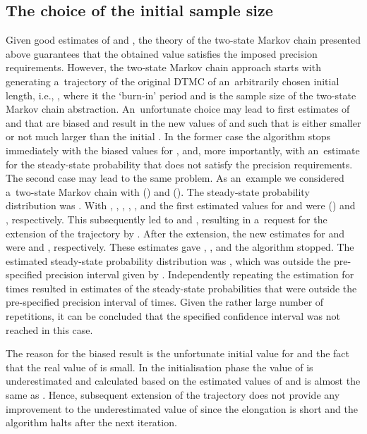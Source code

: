 \documentclass[runningheads,a4paper]{llncs}
\begin{document}
\subsection{The choice of the initial sample size}
Given good estimates of  and , the theory of the two-state Markov chain presented
above guarantees that the obtained value satisfies the imposed precision requirements.
However, the two-state Markov chain approach starts with generating a~trajectory of the original
DTMC of an~arbitrarily chosen initial length, i.e., , where
 it the `burn-in' period and  is the sample size of the two-state Markov chain
abstraction. An~unfortunate choice may lead to first estimates of  and  that are
biased and result in the new values of  and  such that  is either smaller or not much
larger than the initial . In the former case the algorithm stops immediately with the
biased values for ,  and, more importantly, with an~estimate for the steady-state
probability that does not satisfy the precision requirements. The second case may lead to the same
problem. As an~example we considered a~two-state Markov chain with 
() and  (). The steady-state probability distribution was
. With , , , , ,
and  the first estimated values for  and  were 
() and , respectively. This subsequently led to  and , resulting in
a~request for the extension of the trajectory by . After the extension, the new estimates for
 and  were  and , respectively. These estimates gave ,
, and the algorithm stopped. The estimated steady-state probability distribution was
, which was outside the pre-specified precision interval given by .
Independently repeating the estimation for  times resulted in estimates of the
steady-state probabilities that were outside the pre-specified precision interval  of times.
Given the rather large number of repetitions, it can be concluded that the specified 
confidence interval was not reached in this case.

The reason for the biased result is the unfortunate initial value for  and the fact that
the real value of  is small. In the initialisation phase the value of 
is underestimated and  calculated based on the estimated values of
 and  is almost the same as . Hence, subsequent extension of the trajectory
does not provide any improvement to the underestimated value of  since the elongation is
short and the algorithm halts after the next iteration.
\end{document}
